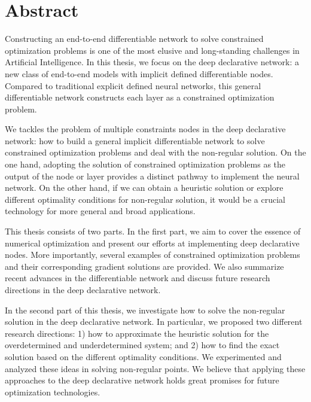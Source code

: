 \chapter*{Abstract}
\vspace{-1em}
Constructing an end-to-end differentiable network to solve constrained optimization problems is one of the most elusive
and long-standing challenges in Artificial Intelligence. In this thesis, we focus on the deep declarative network: a new class of end-to-end models with implicit defined differentiable nodes. Compared to traditional explicit defined neural networks, this general differentiable network constructs each layer as a constrained optimization problem. 
\par We tackles the problem of multiple constraints nodes in the deep declarative network: how to build a general implicit differentiable network to solve constrained optimization problems and deal with the non-regular solution. On the one hand, adopting the solution of constrained optimization problems as the output of the node or layer provides a distinct pathway to implement the neural network. On the other hand, if we can obtain a heuristic solution or explore different optimality conditions for non-regular solution, it would be a crucial technology for more general and broad applications.
\par This thesis consists of two parts. In the first part, we aim to cover the essence of numerical optimization and present our efforts at implementing deep declarative nodes. More importantly, several examples of constrained optimization problems and their corresponding gradient solutions are provided. We also summarize recent advances in the differentiable network and discuss future research directions in the deep declarative network. 
\par In the second part of this thesis, we investigate how to solve the non-regular solution in the deep declarative network. In particular, we proposed two different research directions: 1) how to approximate the heuristic solution for the overdetermined and underdetermined system; and 2) how to find the exact solution based on the different optimality conditions. We experimented and analyzed these ideas in solving non-regular points. We believe that applying these approaches to the deep declarative network holds great promises for future optimization technologies. 
